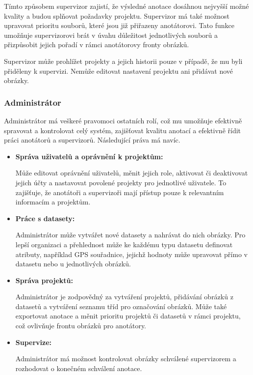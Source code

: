 Tímto způsobem supervizor zajistí, že výsledné anotace dosáhnou nejvyšší možné kvality a budou splňovat požadavky projektu. Supervizor má také možnost upravovat prioritu souborů, které jsou již přiřazeny anotátorovi. Tato funkce umožňuje supervizorovi brát v úvahu důležitost jednotlivých souborů a přizpůsobit jejich pořadí v rámci anotátorovy fronty obrázků.

Supervizor může prohlížet projekty a jejich historii pouze v případě, že mu byli přiděleny k supervizi. Nemůže editovat nastavení projektu ani přidávat nové obrázky.

\subsubsection{Administrátor}
Administrátor má veškeré pravomoci ostatních rolí, což mu umožňuje efektivně spravovat a kontrolovat celý systém, zajišťovat kvalitu anotací a efektivně řídit práci anotátorů a supervizorů. Následující práva má navíc.

\begin{itemize}
    \item \textbf{Správa uživatelů a oprávnění k projektům: }
    
  Může editovat oprávnění uživatelů, měnit jejich role, aktivovat či deaktivovat jejich účty a nastavovat povolené projekty pro jednotlivé uživatele. To zajišťuje, že anotátoři a supervizoři mají přístup pouze k relevantním informacím a projektům.

  \item \textbf{Práce s datasety:}
  
Administrátor může vytvářet nové datasety a nahrávat do nich obrázky. Pro lepší organizaci a přehlednost může ke každému typu datasetu definovat atributy, například GPS souřadnice, jejichž hodnoty může upravovat přímo v datasetu nebo u jednotlivých obrázků.

  \item \textbf{Správa projektů:}
  
Administrátor je zodpovědný za vytváření projektů, přidávání obrázků z datasetů a vytváření seznamu tříd pro označování obrázků. Může také exportovat anotace a měnit prioritu projektů či datasetů v rámci projektu, což ovlivňuje frontu obrázků pro anotátory.

  \item \textbf{Supervize:}
  
Administrátor má možnost kontrolovat obrázky schválené supervizorem a rozhodovat o konečném schválení anotace.
\end{itemize}
